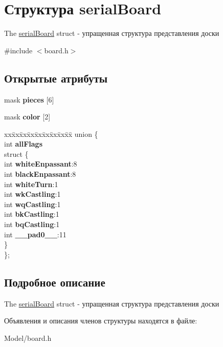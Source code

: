 \hypertarget{structserial_board}{}\section{Структура serial\+Board}
\label{structserial_board}


The \hyperlink{structserial_board}{serial\+Board} struct -\/ упращенная структура представления доски  




{\ttfamily \#include $<$board.\+h$>$}

\subsection*{Открытые атрибуты}
\begin{DoxyCompactItemize}
\item 
\hypertarget{structserial_board_a0a27eb05a8303039ae133c24c99e5665}{}mask {\bfseries pieces} \mbox{[}6\mbox{]}\label{structserial_board_a0a27eb05a8303039ae133c24c99e5665}

\item 
\hypertarget{structserial_board_a902c488370344e2ba5d48a64e3d4aa75}{}mask {\bfseries color} \mbox{[}2\mbox{]}\label{structserial_board_a902c488370344e2ba5d48a64e3d4aa75}

\item 
\hypertarget{structserial_board_a362750c1f255e200d28d4b2f34699c92}{}\begin{tabbing}
xx\=xx\=xx\=xx\=xx\=xx\=xx\=xx\=xx\=\kill
union \{\\
\>int {\bfseries allFlags}\\
\hypertarget{unionserial_board_1_1@0_a24409ca85bea9c6dab79a506c491785d}{}\>struct \{\\
\>\>int {\bfseries whiteEnpassant}:8\\
\>\>int {\bfseries blackEnpassant}:8\\
\>\>int {\bfseries whiteTurn}:1\\
\>\>int {\bfseries wkCastling}:1\\
\>\>int {\bfseries wqCastling}:1\\
\>\>int {\bfseries bkCastling}:1\\
\>\>int {\bfseries bqCastling}:1\\
\>\>int {\bfseries \_\_pad0\_\_}:11\\
\>\} \label{unionserial_board_1_1@0_a24409ca85bea9c6dab79a506c491785d}
\\
\}; \label{structserial_board_a362750c1f255e200d28d4b2f34699c92}
\\

\end{tabbing}\end{DoxyCompactItemize}


\subsection{Подробное описание}
The \hyperlink{structserial_board}{serial\+Board} struct -\/ упращенная структура представления доски 

Объявления и описания членов структуры находятся в файле\+:\begin{DoxyCompactItemize}
\item 
Model/board.\+h\end{DoxyCompactItemize}
